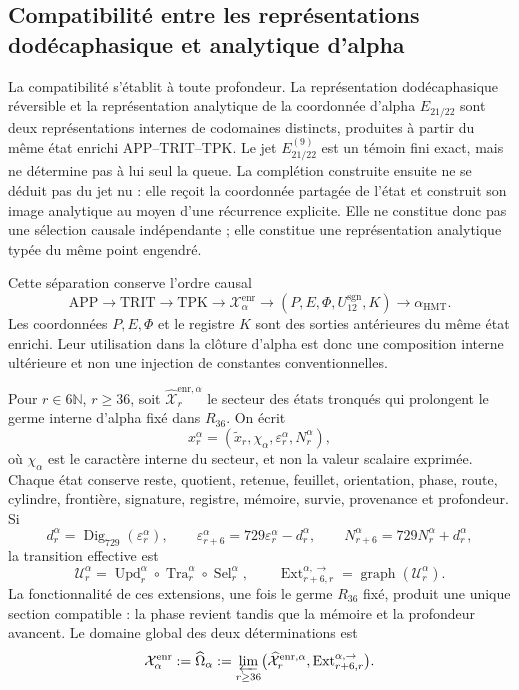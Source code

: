 \subsection{Compatibilité entre les représentations dodécaphasique et analytique d'alpha}
\label{subsec:alpha-publicaciones-completas}

La compatibilité s’établit à toute profondeur. La représentation
dodécaphasique réversible et la représentation analytique de la
coordonnée d’alpha
\(E_{21/22}\) sont deux représentations internes de codomaines distincts,
produites à partir du même état enrichi APP--TRIT--TPK. Le jet
\(E_{21/22}^{(9)}\) est un témoin fini exact, mais ne détermine pas à lui seul
la queue. La complétion construite ensuite ne se déduit pas du jet
nu : elle reçoit la coordonnée partagée de l’état et construit son image
analytique au moyen d’une récurrence explicite. Elle ne constitue donc pas une
sélection causale indépendante ; elle constitue une représentation analytique
typée du même point engendré.

Cette séparation conserve l'ordre causal
\[
 \mathrm{APP}\longrightarrow\mathrm{TRIT}\longrightarrow\mathrm{TPK}
 \longrightarrow\mathcal X_{\alpha}^{\mathrm{enr}}
 \longrightarrow (P,E,\Phi,U_{12}^{\mathrm{sgn}},K)
 \longrightarrow\alpha_{\mathrm{HMT}}.
\]
Les coordonnées \(P,E,\Phi\) et le registre \(K\) sont des sorties antérieures du
même état enrichi. Leur utilisation dans la clôture d'alpha est donc une
composition interne ultérieure et non une injection de constantes
conventionnelles.

Pour \(r\in6\mathbb N\), \(r\ge36\), soit
\(\widehat{\mathcal X}^{\mathrm{enr},\alpha}_r\) le secteur des états
tronqués qui prolongent le germe interne d'alpha fixé dans \(R_{36}\). On
écrit
\[
 x_r^\alpha=(\widetilde x_r,\chi_\alpha,
              \varepsilon_r^\alpha,N_r^\alpha),
\]
où \(\chi_\alpha\) est le caractère interne du secteur, et non la valeur scalaire
exprimée. Chaque état conserve reste, quotient, retenue, feuillet, orientation,
phase, route, cylindre, frontière, signature, registre, mémoire, survie,
provenance et profondeur. Si
\[
 d_r^\alpha=\operatorname{Dig}_{729}(\varepsilon_r^\alpha),\qquad
 \varepsilon_{r+6}^\alpha=729\varepsilon_r^\alpha-d_r^\alpha,
 \qquad N_{r+6}^\alpha=729N_r^\alpha+d_r^\alpha,
\]
la transition effective est
\[
 \mathcal U_r^\alpha=
 \operatorname{Upd}_r^\alpha\circ
 \operatorname{Tra}_r^\alpha\circ
 \operatorname{Sel}_r^\alpha,
 \qquad
 \operatorname{Ext}^{\alpha,\to}_{r+6,r}
 =\operatorname{graph}(\mathcal U_r^\alpha).
\]
La fonctionnalité de ces extensions, une fois le germe \(R_{36}\) fixé,
produit une unique section compatible : la phase revient tandis que la mémoire et
la profondeur avancent. Le domaine global des deux déterminations est
\begin{equation}
 \mathcal X_\alpha^{\mathrm{enr}}:=\widehat\Omega_\alpha
 :=\varprojlim_{r\ge36}
 \bigl(\widehat{\mathcal X}^{\mathrm{enr},\alpha}_r,
       \operatorname{Ext}^{\alpha,\to}_{r+6,r}\bigr).
 \label{eq:alpha-dominio-enriquecido-completo}
\end{equation}

